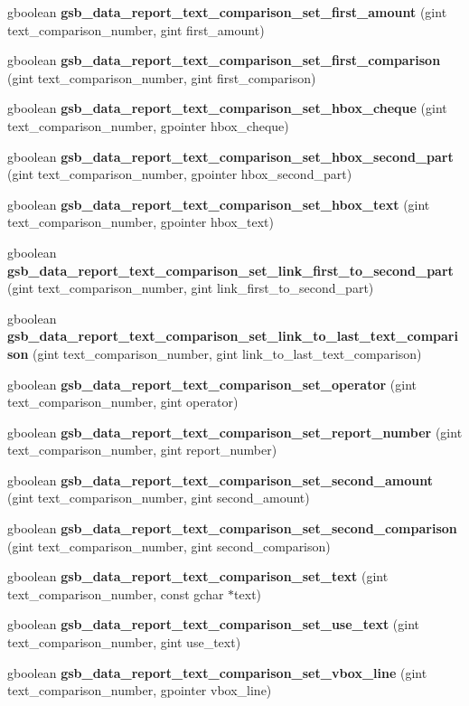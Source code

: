 \begin{DoxyCompactItemize}
\item 
gboolean {\bf gsb\_\-data\_\-report\_\-text\_\-comparison\_\-set\_\-first\_\-amount} (gint text\_\-comparison\_\-number, gint first\_\-amount)
\item 
gboolean {\bf gsb\_\-data\_\-report\_\-text\_\-comparison\_\-set\_\-first\_\-comparison} (gint text\_\-comparison\_\-number, gint first\_\-comparison)
\item 
gboolean {\bf gsb\_\-data\_\-report\_\-text\_\-comparison\_\-set\_\-hbox\_\-cheque} (gint text\_\-comparison\_\-number, gpointer hbox\_\-cheque)
\item 
gboolean {\bf gsb\_\-data\_\-report\_\-text\_\-comparison\_\-set\_\-hbox\_\-second\_\-part} (gint text\_\-comparison\_\-number, gpointer hbox\_\-second\_\-part)
\item 
gboolean {\bf gsb\_\-data\_\-report\_\-text\_\-comparison\_\-set\_\-hbox\_\-text} (gint text\_\-comparison\_\-number, gpointer hbox\_\-text)
\item 
gboolean {\bf gsb\_\-data\_\-report\_\-text\_\-comparison\_\-set\_\-link\_\-first\_\-to\_\-second\_\-part} (gint text\_\-comparison\_\-number, gint link\_\-first\_\-to\_\-second\_\-part)
\item 
gboolean {\bf gsb\_\-data\_\-report\_\-text\_\-comparison\_\-set\_\-link\_\-to\_\-last\_\-text\_\-comparison} (gint text\_\-comparison\_\-number, gint link\_\-to\_\-last\_\-text\_\-comparison)
\item 
gboolean {\bf gsb\_\-data\_\-report\_\-text\_\-comparison\_\-set\_\-operator} (gint text\_\-comparison\_\-number, gint operator)
\item 
gboolean {\bf gsb\_\-data\_\-report\_\-text\_\-comparison\_\-set\_\-report\_\-number} (gint text\_\-comparison\_\-number, gint report\_\-number)
\item 
gboolean {\bf gsb\_\-data\_\-report\_\-text\_\-comparison\_\-set\_\-second\_\-amount} (gint text\_\-comparison\_\-number, gint second\_\-amount)
\item 
gboolean {\bf gsb\_\-data\_\-report\_\-text\_\-comparison\_\-set\_\-second\_\-comparison} (gint text\_\-comparison\_\-number, gint second\_\-comparison)
\item 
gboolean {\bf gsb\_\-data\_\-report\_\-text\_\-comparison\_\-set\_\-text} (gint text\_\-comparison\_\-number, const gchar $\ast$text)
\item 
gboolean {\bf gsb\_\-data\_\-report\_\-text\_\-comparison\_\-set\_\-use\_\-text} (gint text\_\-comparison\_\-number, gint use\_\-text)
\item 
gboolean {\bf gsb\_\-data\_\-report\_\-text\_\-comparison\_\-set\_\-vbox\_\-line} (gint text\_\-comparison\_\-number, gpointer vbox\_\-line)
\end{DoxyCompactItemize}


